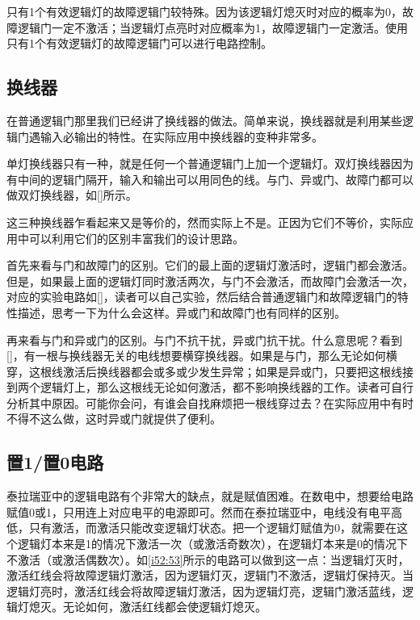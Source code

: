 只有1个有效逻辑灯的故障逻辑门较特殊。因为该逻辑灯熄灭时对应的概率为0，故障逻辑门一定不激活；当逻辑灯点亮时对应概率为1，故障逻辑门一定激活。使用只有1个有效逻辑灯的故障逻辑门可以进行电路控制。

\subsection{换线器}
在普通逻辑门那里我们已经讲了换线器的做法。简单来说，换线器就是利用某些逻辑门遇输入必输出的特性。在实际应用中换线器的变种非常多。

单灯换线器只有一种，就是任何一个普通逻辑门上加一个逻辑灯。双灯换线器因为有中间的逻辑门隔开，输入和输出可以用同色的线。与门、异或门、故障门都可以做双灯换线器，如\autoref{}所示。

这三种换线器乍看起来又是等价的，然而实际上不是。正因为它们不等价，实际应用中可以利用它们的区别丰富我们的设计思路。

首先来看与门和故障门的区别。它们的最上面的逻辑灯激活时，逻辑门都会激活。但是，如果最上面的逻辑灯同时激活两次，与门不会激活，而故障门会激活一次，对应的实验电路如\autoref{}，读者可以自己实验，然后结合普通逻辑门和故障逻辑门的特性描述，思考一下为什么会这样。异或门和故障门也有同样的区别。

再来看与门和异或门的区别。与门不抗干扰，异或门抗干扰。什么意思呢？看到\autoref{}，有一根与换线器无关的电线想要横穿换线器。如果是与门，那么无论如何横穿，这根线激活后换线器都会或多或少发生异常；如果是异或门，只要把这根线接到两个逻辑灯上，那么这根线无论如何激活，都不影响换线器的工作。读者可自行分析其中原因。可能你会问，有谁会自找麻烦把一根线穿过去？在实际应用中有时不得不这么做，这时异或门就提供了便利。

\subsection{置1/置0电路}

泰拉瑞亚中的逻辑电路有个非常大的缺点，就是赋值困难。在数电中，想要给电路赋值0或1，只用连上对应电平的电源即可。然而在泰拉瑞亚中，电线没有电平高低，只有激活，而激活只能改变逻辑灯状态。把一个逻辑灯赋值为0，就需要在这个逻辑灯本来是1的情况下激活一次（或激活奇数次），在逻辑灯本来是0的情况下不激活（或激活偶数次）。如\autoref{i52:53}所示的电路可以做到这一点：当逻辑灯灭时，激活红线会将故障逻辑灯激活，因为逻辑灯灭，逻辑门不激活，逻辑灯保持灭。当逻辑灯亮时，激活红线会将故障逻辑灯激活，因为逻辑灯亮，逻辑门激活蓝线，逻辑灯熄灭。无论如何，激活红线都会使逻辑灯熄灭。

\begin{figure}[!h]
\begin{center}
\end{center}
\caption{}
\label{i52:53}
\end{figure}

